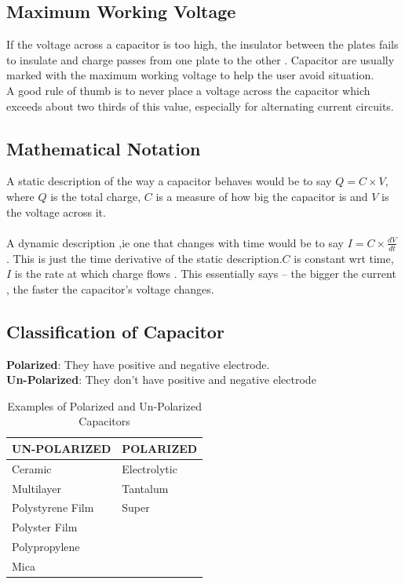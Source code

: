 	\subsection{Maximum Working Voltage}
		If the voltage across a capacitor is too high, the insulator between the plates fails to insulate and charge passes from one plate to the other . Capacitor are usually marked with the maximum working voltage to help the user avoid situation.\\
		A good rule of thumb is to never place a voltage across the capacitor which exceeds about two thirds of this value, especially for alternating current circuits.
		
	\subsection{Mathematical Notation}
		A static description of the way a capacitor behaves would be to say $Q=C \times V$, where $Q$ is the total charge, $C$ is a measure of how big the capacitor is and $V$ is the voltage across it.\\
		\\
		A dynamic description ,ie one that changes with time would be to say $I = C \times\frac{dV}{dt}$ . This is just the time derivative of the static description.$C$ is constant wrt time, $I$ is the rate at which charge flows . This essentially says – the bigger the current , the faster the capacitor’s voltage changes.
		
				
	\subsection{Classification of Capacitor}
		\textbf{Polarized}: They have positive and negative electrode.\\
		\textbf{Un-Polarized}: They don't have positive and negative electrode
		\begin{table}[h]
			\centering
			\begin{tabular}{|l|l|}
				\hline
				\textbf{UN-POLARIZED} & \textbf{POLARIZED} \\
				\hline
				Ceramic & Electrolytic \\
				\hline
				Multilayer & Tantalum \\
				\hline
				Polystyrene Film & Super \\
				\hline
				Polyster Film &  \\
				\hline
				Polypropylene &  \\
				\hline
				Mica &  \\
				\hline
			\end{tabular}
		\caption{Examples of Polarized and Un-Polarized Capacitors}
		\end{table}
		
